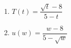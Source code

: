 


\begin{multicols}{2}
\begin{enumerate}
\setcounter{enumi}{\value{HW}}

\item $T(t) = \dfrac{\sqrt{t} - 8}{5-t}$ 
\item $u(w) = \dfrac{w - 8}{5 - \sqrt{w}}$ \label{finddomainlast}

\setcounter{HW}{\value{enumi}}
\end{enumerate}
\end{multicols}

\newpage

